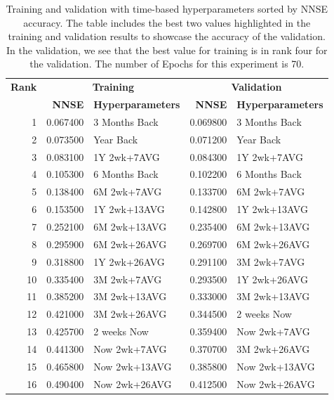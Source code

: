 \documentclass[utf8]{FrontiersinVancouver} %
\begin{document}
\begin{table}[htb]

  \caption{Training and validation with time-based hyperparameters
    sorted by NNSE accuracy. The table includes the best two
    values highlighted in the training and validation results to
    showcase the accuracy of the validation. In the validation,
    we see that the best value for training is in rank four for the
    validation. The number of Epochs for this experiment is 70.}
  \label{tab:training-70}

  \renewcommand{\arraystretch}{1.2}
\begin{center}
\begin{tabular}{|r|rl||rl|}
  \hline
{\bf Rank} & \multicolumn{2}{c||}{\bfseries Training} & \multicolumn{2}{c|}{\bfseries Validation} \\
     &   {\bf NNSE} & {\bf Hyperparameters} & {\bf NNSE} & {\bf Hyperparameters} \\
              \hline
 1 & \color{red} 0.067400 & \color{red} 3 Months Back & \color{red}0.069800 & \color{red} 3 Months Back \\
 2 & \color{blue} 0.073500 & \color{blue} Year Back & \color{blue} 0.071200 & \color{blue} Year Back \\
 3 & 0.083100 & 1Y 2wk+7AVG & 0.084300 & 1Y 2wk+7AVG \\
 4 & 0.105300 & 6 Months Back & 0.102200 & 6 Months Back \\
 5 & 0.138400 & 6M 2wk+7AVG & 0.133700 & 6M 2wk+7AVG \\
 6 & 0.153500 & 1Y 2wk+13AVG & 0.142800 & 1Y 2wk+13AVG \\
 7 & 0.252100 & 6M 2wk+13AVG & 0.235400 & 6M 2wk+13AVG \\
 8 & 0.295900 & 6M 2wk+26AVG & 0.269700 & 6M 2wk+26AVG \\
 9 & 0.318800 & 1Y 2wk+26AVG & 0.291100 & 3M 2wk+7AVG \\
10 & 0.335400 & 3M 2wk+7AVG & 0.293500 & 1Y 2wk+26AVG \\
11 & 0.385200 & 3M 2wk+13AVG & 0.333000 & 3M 2wk+13AVG \\
12 & 0.421000 & 3M 2wk+26AVG & 0.344500 & 2 weeks Now \\
13 & 0.425700 & 2 weeks Now & 0.359400 & Now 2wk+7AVG \\
14 & 0.441300 & Now 2wk+7AVG & 0.370700 & 3M 2wk+26AVG \\
15 & 0.465800 & Now 2wk+13AVG & 0.385800 & Now 2wk+13AVG \\
16 & 0.490400 & Now 2wk+26AVG & 0.412500 & Now 2wk+26AVG \\
\hline
\end{tabular}
\end{center}

\end{table}
\end{document}
